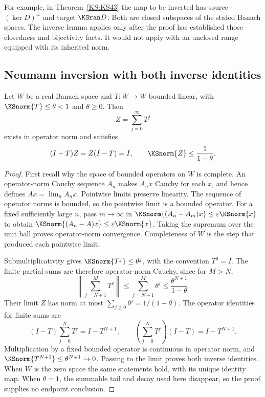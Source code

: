 \documentclass[11pt,oneside,openany]{book}
\numberwithin{equation}{section}
\begin{document}
For example, in Theorem~\ref{KS:KS43} the map to be inverted has source \((\ker D)^\perp\) and target \(\KSran D\). Both are closed subspaces of the stated Banach spaces. The inverse lemma applies only after the proof has established those closedness and bijectivity facts. It would not apply with an unclosed range equipped with its inherited norm.

\subsection{Neumann inversion with both inverse identities}
\begin{KSlemma}\label{KS:lem:neumann-tool}
Let \(W\) be a real Banach space and \(T:W\to W\) bounded linear, with \(\KSnorm{T}\le\theta<1\) and \(\theta\ge0\). Then
\[
 Z=\sum_{j=0}^{\infty}T^j
\]
exists in operator norm and satisfies
\[
 (I-T)Z=Z(I-T)=I,\qquad \KSnorm{Z}\le\frac1{1-\theta}.
\]
\end{KSlemma}
\begin{proof}
First recall why the space of bounded operators on \(W\) is complete. An operator-norm Cauchy sequence \(A_n\) makes \(A_nx\) Cauchy for each \(x\), and hence defines \(Ax=\lim_nA_nx\). Pointwise limits preserve linearity. The sequence of operator norms is bounded, so the pointwise limit is a bounded operator. For a fixed sufficiently large \(n\), pass \(m\to\infty\) in \(\KSnorm{(A_n-A_m)x}\le\varepsilon\KSnorm{x}\) to obtain \(\KSnorm{(A_n-A)x}\le\varepsilon\KSnorm{x}\). Taking the supremum over the unit ball proves operator-norm convergence. Completeness of \(W\) is the step that produced each pointwise limit.

Submultiplicativity gives \(\KSnorm{T^j}\le\theta^j\), with the convention \(T^0=I\). The finite partial sums are therefore operator-norm Cauchy, since for \(M>N\),
\[
 \left\|\sum_{j=N+1}^{M}T^j\right\|
 \le\sum_{j=N+1}^{M}\theta^j\le\frac{\theta^{N+1}}{1-\theta}.
\]
Their limit \(Z\) has norm at most \(\sum_{j\ge0}\theta^j=1/(1-\theta)\). The operator identities for finite sums are
\[
 (I-T)\sum_{j=0}^{N}T^j=I-T^{N+1},\qquad
 \left(\sum_{j=0}^{N}T^j\right)(I-T)=I-T^{N+1}.
\]
Multiplication by a fixed bounded operator is continuous in operator norm, and \(\KSnorm{T^{N+1}}\le\theta^{N+1}\to0\). Passing to the limit proves both inverse identities. When \(W\) is the zero space the same statements hold, with its unique identity map. When \(\theta=1\), the summable tail and decay used here disappear, so the proof supplies no endpoint conclusion.
\end{proof}
\end{document}

